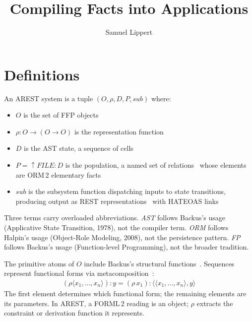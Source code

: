 \documentclass[acmsmall,screen,review]{acmart}
\title{Compiling Facts into Applications}
\author{Samuel Lippert}
\affiliation{%
  \institution{Drivly Inc}
  \city{Shakopee}
  \state{Minnesota}
  \country{USA}
}
\begin{document}
\maketitle

\section{Definitions}

\begin{definition}[AREST]\label{def:arest}
An AREST system is a tuple $(O, \rho, D, P, \mathit{sub})$ where:
\begin{itemize}[nosep]
\item $O$ is the set of FFP objects~\cite[Sec.\,13.2]{backus78}
\item $\rho: O \to (O \to O)$ is the representation function~\cite[Sec.\,13.3.2]{backus78}
\item $D$ is the AST state, a sequence of cells~\cite[Sec.\,14.3]{backus78}
\item $P = \uparrow\!\mathit{FILE}\!:\!D$ is the population, a named set of relations~\cite[Sec.\,1.6]{codd70} whose elements are ORM\,2 elementary facts~\cite[Ch.\,2]{halpin08}
\item $\mathit{sub}$ is the subsystem function dispatching inputs to state transitions, producing output as REST representations~\cite{fielding00} with HATEOAS links
\end{itemize}
\end{definition}

Three terms carry overloaded abbreviations. \emph{AST} follows Backus's usage (Applicative State Transition, 1978), not the compiler term. \emph{ORM} follows Halpin's usage (Object-Role Modeling, 2008), not the persistence pattern. \emph{FP} follows Backus's usage (Function-level Programming), not the broader tradition.

The primitive atoms of $O$ include Backus's structural functions~\cite[Sec.\,11.2.3]{backus78}. Sequences represent functional forms via metacomposition~\cite[Sec.\,13.3.2]{backus78}:
\begin{align}
(\rho\langle x_1, \ldots, x_n\rangle)\!:\!y = (\rho\,x_1)\!:\!\langle\langle x_1, \ldots, x_n\rangle, y\rangle \label{eq:metacomp}
\end{align}
The first element determines which functional form; the remaining elements are its parameters. In AREST, a FORML\,2 reading is an object; $\rho$ extracts the constraint or derivation function it represents.
\end{document}
